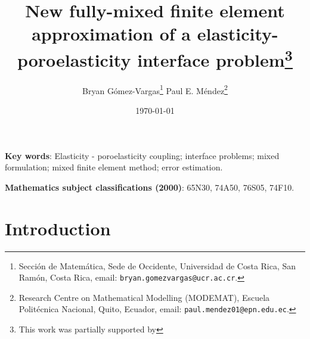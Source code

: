 \documentclass[11pt]{article}
\title{New fully-mixed finite element approximation of a elasticity-poroelasticity interface problem\thanks{This work was
		partially supported by }}
\author{{\sc Bryan G\'omez-Vargas}\thanks{Secci\'on de Matem\'atica, Sede de Occidente, Universidad de Costa Rica, San Ram\'on, Costa Rica, email: {\tt bryan.gomezvargas@ucr.ac.cr}.}
	\quad
	{\sc Paul E. M\'endez}\thanks{Research Centre on Mathematical Modelling (MODEMAT), Escuela
		Polit\'ecnica Nacional, Quito, Ecuador, email: {\tt paul.mendez01@epn.edu.ec}.}}
\date{\today}
\numberwithin{equation}{section}
\numberwithin{equation}{section}
\begin{document}
	\maketitle
	
	\begin{abstract}
		
	\end{abstract}
	\noindent
	{\bf Key words}: Elasticity - poroelasticity coupling; interface problems; mixed formulation; mixed finite element method; error estimation. 
	
	\smallskip\noindent
	{\bf Mathematics subject classifications (2000)}: 65N30, 74A50, 76S05, 74F10.
	
	\maketitle
	
	
	\section{Introduction}
\end{document}
